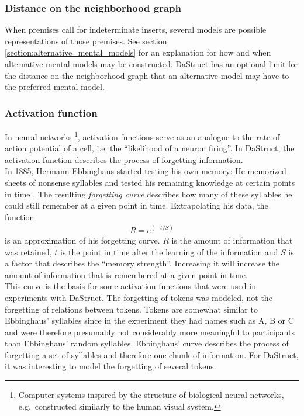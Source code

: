 \documentclass[hidelinks]{scrartcl}
\begin{document}
\subsubsection{Distance on the neighborhood graph}
When premises call for indeterminate inserts, several models are possible representations of those premises. See section \ref{section:alternative_mental_models} for an explanation for how and when alternative mental models may be constructed. DaStruct has an optional limit for the distance on the neighborhood graph that an alternative model may have to the preferred mental model.

\subsubsection{Activation function}\label{sec:activation_function}
In neural networks \footnote{Computer systems inspired by the structure of biological neural networks, e.g.\ constructed similarly to the human visual system.}, activation functions serve as an analogue to the rate of action potential of a cell, i.e. the ``likelihood of a neuron firing''. In DaStruct, the activation function describes the process of forgetting information. \\
In 1885, Hermann Ebbinghaus started testing his own memory: He memorized sheets of nonsense syllables and tested his remaining knowledge at certain points in time \citep{Ebbinghaus.1913}. The resulting \textit{forgetting curve} describes how many of these syllables he could still remember at a given point in time. Extrapolating his data, the function
\begin{gather}
R = e^{(-t/S)}
\end{gather}
is an approximation of his forgetting curve. $R$ is the amount of information that was retained, $t$ is the point in time after the learning of the information and $S$ is a factor that describes the ``memory strength''. Increasing it will increase the amount of information that is remembered at a given point in time. \\

This curve is the basis for some activation functions that were used in experiments with DaStruct. The forgetting of tokens was modeled, not the forgetting of relations between tokens. Tokens are somewhat similar to Ebbinghaus' syllables since in the experiment they had names such as A, B or C and were therefore presumably not considerably more meaningful to participants than Ebbinghaus' random syllables. Ebbinghaus' curve describes the process of forgetting a set of syllables and therefore one chunk of information. For DaStruct, it was interesting to model the forgetting of several tokens. \\
\end{document}
